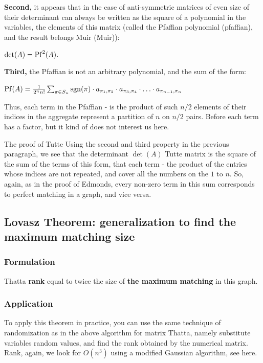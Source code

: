 \textbf{Second,} it appears that in the case of anti-symmetric matrices of even size of their determinant can always be written as the square of a polynomial in the variables, the elements of this matrix (called the Pfaffian polynomial (pfaffian), and the result belongs Muir (Muir)):

$\det (A) = {\rm Pf} ^ 2 (A).$

\textbf{Third,} the Pfaffian is not an arbitrary polynomial, and the sum of the form:

${\rm Pf}(A)=\frac{1}{2^{n}n!}\sum_{\pi\in S_{n}}{\rm sgn}(\pi)\cdot a_{\pi_{1},\pi_{2}}\cdot a_{\pi_{3},\pi_{4}}\cdot\ldots\cdot a_{\pi_{n-1},\pi_{n}}$

Thus, each term in the Pfaffian - is the product of such $n / 2$ elements of their indices in the aggregate represent a partition of $n$ on $n / 2$ pairs. Before each term has a factor, but it kind of does not interest us here.

The proof of Tutte
Using the second and third property in the previous paragraph, we see that the determinant $\det (A)$ Tutte matrix is ​​the square of the sum of the terms of this form, that each term - the product of the entries whose indices are not repeated, and cover all the numbers on the $1$ to $n$. So, again, as in the proof of Edmonds, every non-zero term in this sum corresponds to perfect matching in a graph, and vice versa.

\subsection{ Lovasz Theorem: generalization to find the maximum matching size }

\subsubsection{ Formulation }

Thatta \textbf{rank} equal to twice the size of \textbf{the maximum matching} in this graph.

\subsubsection{ Application }

To apply this theorem in practice, you can use the same technique of randomization as in the above algorithm for matrix Thatta, namely substitute variables random values, and find the rank obtained by the numerical matrix. Rank, again, we look for $O (n ^ 3)$ using a modified Gaussian algorithm, see here.

